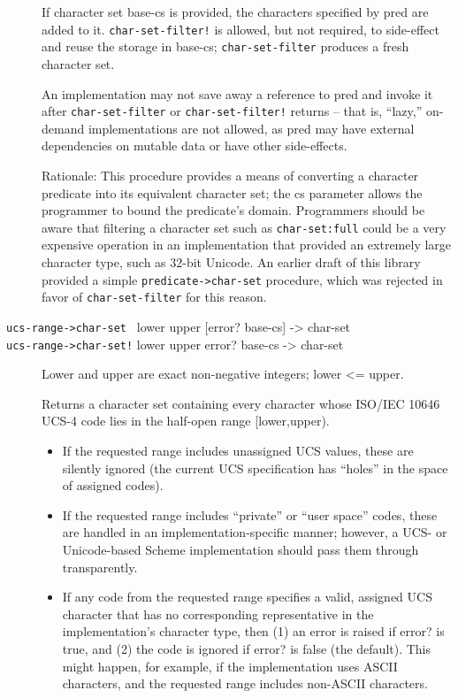 \begin{description}
If character set base-cs is provided, the characters specified by pred
are added to it. \texttt{char-set-filter!} is allowed, but not required,
to side-effect and reuse the storage in base-cs;
\texttt{char-set-filter} produces a fresh character set.

An implementation may not save away a reference to pred and invoke it
after \texttt{char-set-filter} or \texttt{char-set-filter!} returns --
that is, ``lazy,'' on-demand implementations are not allowed, as pred
may have external dependencies on mutable data or have other
side-effects.

Rationale: This procedure provides a means of converting a character
predicate into its equivalent character set; the cs parameter allows the
programmer to bound the predicate's domain. Programmers should be aware
that filtering a character set such as \texttt{char-set:full} could be a
very expensive operation in an implementation that provided an extremely
large character type, such as 32-bit Unicode. An earlier draft of this
library provided a simple \texttt{predicate-\textgreater{}char-set}
procedure, which was rejected in favor of \texttt{char-set-filter} for
this reason.
\item[ \href{}{} \href{}{} \texttt{ucs-range-\textgreater{}char-set~}
lower upper {[}error? base-cs{]} -\textgreater{} char-set\\
\texttt{ucs-range-\textgreater{}char-set!} lower upper error? base-cs
-\textgreater{} char-set ]
Lower and upper are exact non-negative integers; lower \textless{}=
upper.

Returns a character set containing every character whose ISO/IEC 10646
UCS-4 code lies in the half-open range {[}lower,upper).

\begin{itemize}
\tightlist
\item
  If the requested range includes unassigned UCS values, these are
  silently ignored (the current UCS specification has ``holes'' in the
  space of assigned codes).
\item
  If the requested range includes ``private'' or ``user space'' codes,
  these are handled in an implementation-specific manner; however, a
  UCS- or Unicode-based Scheme implementation should pass them through
  transparently.
\item
  If any code from the requested range specifies a valid, assigned UCS
  character that has no corresponding representative in the
  implementation's character type, then (1) an error is raised if error?
  is true, and (2) the code is ignored if error? is false (the default).
  This might happen, for example, if the implementation uses ASCII
  characters, and the requested range includes non-ASCII characters.
\end{itemize}


\end{description}
